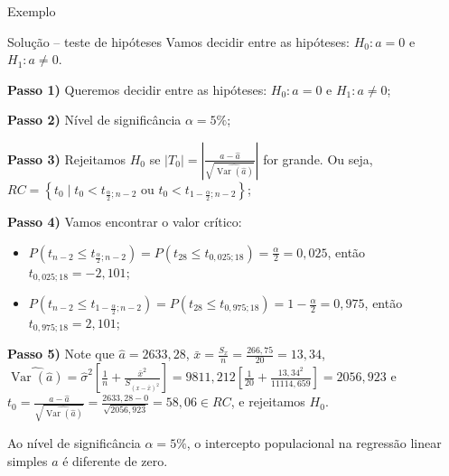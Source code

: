 \documentclass[8pt]{beamer}
\DeclareMathOperator{\vari}{Var}
\begin{document}
\begin{frame}{Exemplo}

	\begin{block}{Solução -- teste de hipóteses}
	Vamos decidir entre as hipóteses: $H_0: a=0$ e $H_1: a \neq 0$.
	
	\textbf{Passo 1)} Queremos decidir entre as hipóteses: $H_0: a = 0$  e $H_1: a \neq 0$;
	
	\textbf{Passo 2)} Nível de significância $\alpha=5\%$;
	
	\textbf{Passo 3)} Rejeitamos $H_0$ se $\lvert T_0 \rvert = \left\lvert \frac{a - \hat{a}}{\sqrt{\widehat{\vari({\hat{a}})}}} \right\rvert$ for grande. Ou seja, $RC = \left\{ t_0 \mid t_0 < t_{\frac{\alpha}{2}; n-2} \mbox{ ou } t_0 < t_{1-\frac{\alpha}{2}; n-2}  \right\}$;
	
	\textbf{Passo 4)} Vamos encontrar o valor crítico:
	\begin{itemize}
		\item $P\left(t_{n-2} \leq t_{\frac{\alpha}{2}; n-2}\right) = P\left(t_{28} \leq t_{0,025; 18}\right) = \frac{\alpha}{2} = 0,025$, então $t_{0,025; 18} =  -2,101
		$;
		\item $P\left(t_{n-2} \leq t_{1-\frac{\alpha}{2}; n-2}\right) = P\left(t_{28} \leq t_{0,975; 18}\right) = 1-\frac{\alpha}{2} = 0,975$, então $t_{0,975; 18} =  2,101
		$;
	\end{itemize}
	
	\textbf{Passo 5)} Note que $\hat{a} = 2633,28$, $\bar{x} = \frac{S_x}{n} = \frac{266,75}{20} = 13,34$,  $\widehat{\vari({\hat{a}})} = \hat{\sigma}^2 \left[ \frac{1}{n} +  \frac{\bar{x}^2}{S_{(x-\bar{x})^2}} \right] =  9811,212 \left[ \frac{1}{20} + \frac{13,34^2}{11114,659} \right]  = 2056,923$ e $t_0 = \frac{a - \hat{a}}{\sqrt{\widehat{\vari({\hat{a}})}}} = \frac{2633,28 - 0}{\sqrt{2056,923}} = 58,06  \in RC$, e rejeitamos $H_0$.
	
	Ao nível de significância $\alpha=5\%$, o intercepto populacional na regressão linear simples $a$ é diferente de zero.
\end{block}
\end{frame}
\end{document}
